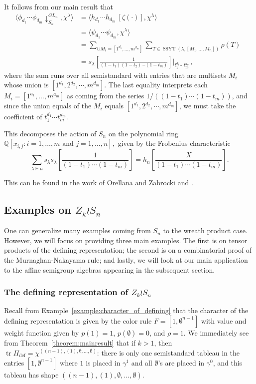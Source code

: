 \documentclass[a4paper,12pt]{amsart}
\theoremstyle{plain}
\theoremstyle{definition}
\theoremstyle{remark}
\DeclareMathOperator{\defining}{def}
\DeclareMathOperator{\SSYT}{SSYT}
\DeclareMathOperator{\tr}{tr}
\begin{document}
It follows from our main result that
\begin{align*}
\langle \phi_{d_1} \cdots \phi_{d_m} \downarrow^{GL_n}_{S_n} , \chi^{\lambda} \rangle  & = \langle h_{d_1} \cdots h_{ d_m}~ \left[\zeta (\cdot)\right] , \chi^{\lambda} \rangle \\
& = \langle \psi_{d_1} \cdots \psi_{d_m} , \chi^{\lambda} \rangle \\
  &=\sum_{\cup M_i = [1^{d_1},\dots, m^{d_m}]} \sum_{T \in \SSYT(\lambda, [M_1,\dots,M_n])} \rho(T)  ~~
  \\
  &= s_\lambda\left[\frac{1}{(1-t_1)(1-t_2)\cdots (1-t_m)}\right]\Big|_{t_1^{d_1} \cdots t_m^{d_m}},
\end{align*}
where the sum runs over all semistandard with entries that are multisets $M_i$ whose union is $[1^{d_1}, 2^{d_2}, \cdots, m^{d_m}]$. 
The last equality interprets each $M_i = [1^{a_1},\dots, m^{a_m}]$ as coming from the series $1/((1-t_1)\cdots (1-t_m))$, and since the union equals of the $M_i$ equals $[1^{d_1}, 2^{d_2}, \cdots, m^{d_m}]$, we must take the coefficient of $t_1^{d_1}\cdots t_m^{d_m}$.

This decomposes the action of $S_n$ on the polynomial ring $
\mathbb{Q}[x_{i,j}:i=1,\dots, m \text{ and } j=1,\dots, n],
$
given by the Frobenius characteristic
\[
\sum_{\lambda \vdash n} s_\lambda s_\lambda\left[ \frac{1}{(1-t_1)\cdots (1-t_m)}\right] = h_n \left[ \frac{X}{(1-t_1)\cdots (1-t_m)}\right].
\]

This can be found in the work of Orellana and Zabrocki \cite{OrellanaZabrocki} and \cite{Romero}.

\subsection{Examples on \texorpdfstring{$Z_k \wr S_n$}{ZkSn}}
One can generalize many examples coming from $S_n$ to the wreath product case. However, we will focus on providing three main examples. The first is on tensor products of the defining representation; the second is on a combinatorial proof of the Murnaghan-Nakayama rule; and lastly, we will look at our main application to the affine semigroup algebras appearing in the subsequent section.

\subsubsection{The defining representation of \texorpdfstring{$Z_k \wr S_n$}{ZkSn}} \label{section:wreath_defining_representation}
Recall from Example~\ref{example:character_of_defining} that the character of the defining representation is given by the color rule $F = [1,\emptyset^{n-1}]$ with value and weight function given by $p(1) = 1$, $p(\emptyset) = 0$, and $\rho = 1$. 
We immediately see from Theorem~\ref{theorem:mainresult} that if $k >1$, then $\tr \Pi_{\defining} = \chi^{((n-1),(1),\emptyset,\dots, \emptyset)}$: there is only one semistandard tableau in the entries $[1,\emptyset^{n-1}]$ where $1$ is placed in $\gamma^1$ and all $\emptyset$'s are placed in $\gamma^0$, and this tableau has shape $((n-1),(1),\emptyset,\dots, \emptyset)$.
\end{document}
